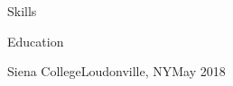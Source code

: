 \documentclass[]{xjavathehutt}
\begin{document}
  \begin{cvsection}{Skills}
    \printskills
  \end{cvsection}

  \begin{cvsection}{Education}
    \begin{cvsubsection}{Siena College}{Loudonville, NY}{May 2018}
    \end{cvsubsection}
  \end{cvsection}

\end{document}
